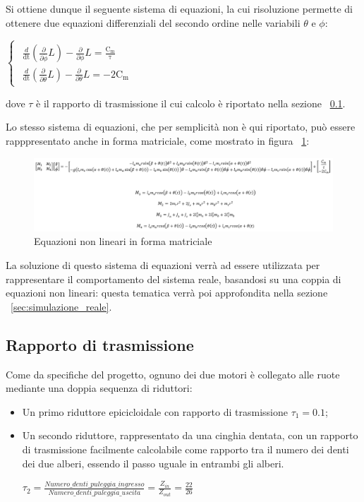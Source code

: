 \newpage
Si ottiene dunque il seguente sistema di equazioni, la cui risoluzione permette di ottenere due equazioni differenziali del secondo ordine nelle variabili $\theta$ e $\phi$:
\begin{center}
	$
	\begin{cases}
		\label{eq:lagrangiana_theta_phi}
		\begin{array}{c}
			\frac{d}{\mathrm{dt}}\left(\frac{\partial }{\partial \dot{\phi} }L\right)-\frac{\partial }{\partial \phi}L=\mathrm{\frac{C_m}{\tau}}\\
			\frac{d}{\mathrm{dt}}\left(\frac{\partial }{\partial \dot{\theta} }L\right)-\frac{\partial }{\partial \theta}L=\mathrm{-2 C_m}
		\end{array}
	\end{cases}
	$
\end{center}
dove $\tau$ è il rapporto di trasmissione il cui calcolo è riportato nella sezione ~\ref{sec:rapp_di_trasmissione}.

Lo stesso sistema di equazioni, che per semplicità non è qui riportato, può essere rapppresentato anche in forma matriciale, come mostrato in figura ~\ref{fig:matrix_sys_non_lin}:

\begin{figure}[h]
	\centering   	
	\includegraphics[width=\textwidth]{Immagini/SistemaMatrciale_NonLin.png}
	\caption{Equazioni non lineari in forma matriciale}
	\label{fig:matrix_sys_non_lin}
\end{figure}

La soluzione di questo sistema di equazioni verrà ad essere utilizzata per rappresentare il comportamento del sistema reale, basandosi su una coppia di equazioni non lineari: questa tematica verrà poi approfondita nella sezione ~\ref{sec:simulazione_reale}.

\subsection{Rapporto di trasmissione}
\label{sec:rapp_di_trasmissione}
Come da specifiche del progetto, ognuno dei due motori è collegato alle ruote mediante una doppia sequenza di riduttori:
\begin{itemize}
	\item Un primo riduttore epicicloidale con rapporto di trasmissione $\tau_1 = 0.1$;
	\item Un secondo riduttore, rappresentato da una cinghia dentata, con un rapporto di trasmissione facilmente calcolabile come rapporto tra il numero dei denti dei due alberi, essendo il passo uguale in entrambi gli alberi.
	\begin{center}
		$\tau_2 = \frac{Numero\_denti\_puleggia\_ingresso}{Numero\_denti\_puleggia\_uscita} = \frac{Z_{in}}{Z_{out}} = \frac{22}{26}$
	\end{center}
\end{itemize}

